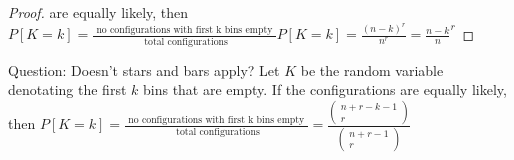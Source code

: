 \documentclass[a4paper]{article}
\begin{document}
\begin{enumerate}
\begin{proof}
      are equally likely, then $P[K=k] = \frac{\text{ no configurations with first k bins empty }}{\text{ total configurations}}
      P[K = k] = \frac{(n-k)^{r}}{n^r} = \frac{n-k}{n}^{r}$
    \end{proof}
    Question: Doesn't stars and bars apply?
      Let $K$ be the random variable denotating the first $k$ bins that are empty. If the configurations 
      are equally likely, then $P[K=k] = \frac{\text{ no configurations with first k bins empty }}{\text{ total configurations}}
      = \frac{\begin{pmatrix} n + r - k - 1 \\ r \end{pmatrix} }{ \begin{pmatrix} n + r - 1 \\ r \end{pmatrix} }$
\end{enumerate}
\end{document}
